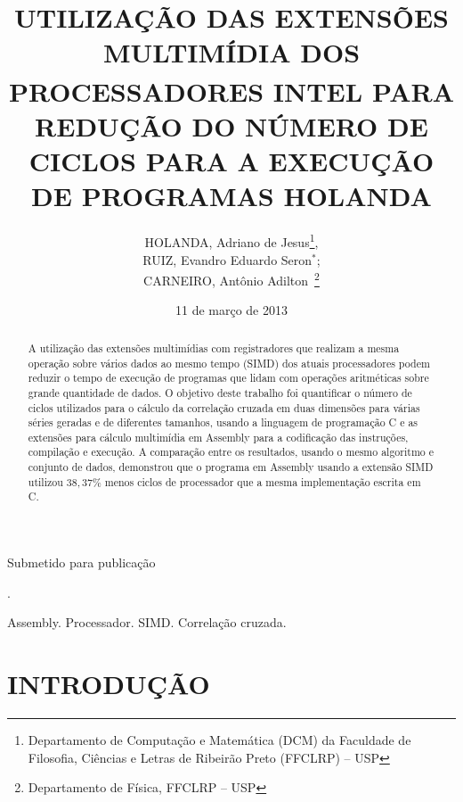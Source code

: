 \documentclass[a4paper]{article}
\def\TR{\textsuperscript{\textregistered}}
\begin{document}
\title{UTILIZAÇÃO DAS EXTENSÕES MULTIMÍDIA DOS PROCESSADORES INTEL\TR{}
  PARA REDUÇÃO DO NÚMERO DE CICLOS PARA A EXECUÇÃO DE PROGRAMAS
  HOLANDA}

\author{HOLANDA, Adriano de Jesus\footnote{Departamento de Computação
    e Matemática (DCM) da Faculdade de Filosofia, Ciências e Letras de
    Ribeirão Preto (FFCLRP) -- USP},\\ RUIZ, Evandro Eduardo Seron$^*$;\\
  CARNEIRO, Antônio Adilton~\footnote{Departamento de Física, FFCLRP
    -- USP}}

\date{11 de março de 2013}

\maketitle

\centerline{\scriptsize Submetido para publicação}.

\begin{abstract}
  A utilização das extensões multimídias com registradores que
  realizam a mesma operação sobre vários dados ao mesmo tempo (SIMD)
  dos atuais processadores podem reduzir o tempo de execução de
  programas que lidam com operações aritméticas sobre grande
  quantidade de dados. O objetivo deste trabalho foi quantificar o
  número de ciclos utilizados para o cálculo da correlação cruzada em
  duas dimensões para várias séries geradas e de diferentes tamanhos,
  usando a linguagem de programação C e as extensões para cálculo
  multimídia em Assembly para a codificação das instruções, compilação
  e execução. A comparação entre os resultados, usando o mesmo
  algoritmo e conjunto de dados, demonstrou que o programa em Assembly
  usando a extensão SIMD utilizou $38,37\%$ menos ciclos de
  processador que a mesma implementação escrita em C.

\end{abstract}
 Assembly. Processador. {\sc SIMD}. Correlação cruzada.

\section*{INTRODUÇÃO}
\end{document}
